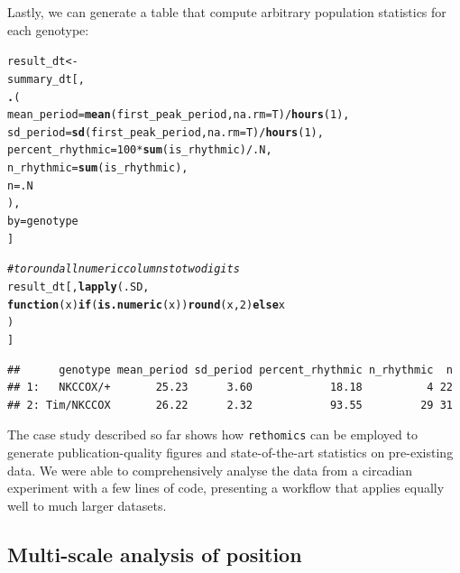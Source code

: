 \documentclass[10pt,letterpaper]{article}\usepackage[]{graphicx}\usepackage[]{color}
\makeatletter
\newcommand{\hlnum}[1]{\textcolor[rgb]{0.686,0.059,0.569}{#1}}%
\newcommand{\hlcom}[1]{\textcolor[rgb]{0.678,0.584,0.686}{\textit{#1}}}%
\newcommand{\hlopt}[1]{\textcolor[rgb]{0,0,0}{#1}}%
\newcommand{\hlstd}[1]{\textcolor[rgb]{0.345,0.345,0.345}{#1}}%
\newcommand{\hlkwa}[1]{\textcolor[rgb]{0.161,0.373,0.58}{\textbf{#1}}}%
\newcommand{\hlkwb}[1]{\textcolor[rgb]{0.69,0.353,0.396}{#1}}%
\newcommand{\hlkwc}[1]{\textcolor[rgb]{0.333,0.667,0.333}{#1}}%
\newcommand{\hlkwd}[1]{\textcolor[rgb]{0.737,0.353,0.396}{\textbf{#1}}}%
\newenvironment{kframe}{%
 \def\at@end@of@kframe{}%
 \ifinner\ifhmode%
  \def\at@end@of@kframe{\end{minipage}}%
  \begin{minipage}{\columnwidth}%
 \fi\fi%
 \def\FrameCommand##1{\hskip\@totalleftmargin \hskip-\fboxsep
 \colorbox{shadecolor}{##1}\hskip-\fboxsep
     \hskip-\linewidth \hskip-\@totalleftmargin \hskip\columnwidth}%
 \MakeFramed {\advance\hsize-\width
   \@totalleftmargin\z@ \linewidth\hsize
   \@setminipage}}%
 {\par\unskip\endMakeFramed%
 \at@end@of@kframe}
\newenvironment{knitrout}{}{} %
\makeatother
\begin{document}
Lastly, we can generate a table that compute arbitrary population statistics for each genotype:
\begin{knitrout}
\color{fgcolor}\begin{kframe}
\begin{alltt}
\hlstd{result_dt} \hlkwb{<-}
  \hlstd{summary_dt[,}
    \hlkwd{.}\hlstd{(}
       \hlkwc{mean_period} \hlstd{=} \hlkwd{mean}\hlstd{(first_peak_period,} \hlkwc{na.rm} \hlstd{= T)} \hlopt{/} \hlkwd{hours}\hlstd{(}\hlnum{1}\hlstd{),}
       \hlkwc{sd_period} \hlstd{=} \hlkwd{sd}\hlstd{(first_peak_period,} \hlkwc{na.rm} \hlstd{= T)} \hlopt{/} \hlkwd{hours}\hlstd{(}\hlnum{1}\hlstd{),}
       \hlkwc{percent_rhythmic} \hlstd{=} \hlnum{100} \hlopt{*} \hlkwd{sum}\hlstd{(is_rhythmic)} \hlopt{/} \hlstd{.N,}
       \hlkwc{n_rhythmic} \hlstd{=} \hlkwd{sum}\hlstd{(is_rhythmic),}
       \hlkwc{n} \hlstd{= .N}
     \hlstd{),}
    \hlkwc{by} \hlstd{= genotype}
  \hlstd{]}

\hlcom{# to round all numeric columns  to two digits}
\hlstd{result_dt[,} \hlkwd{lapply}\hlstd{(.SD,}
                   \hlkwa{function}\hlstd{(}\hlkwc{x}\hlstd{)} \hlkwa{if}\hlstd{(}\hlkwd{is.numeric}\hlstd{(x))} \hlkwd{round}\hlstd{(x,} \hlnum{2}\hlstd{)} \hlkwa{else} \hlstd{x}
                   \hlstd{)}
           \hlstd{]}
\end{alltt}
\begin{verbatim}
##      genotype mean_period sd_period percent_rhythmic n_rhythmic  n
## 1:   NKCCOX/+       25.23      3.60            18.18          4 22
## 2: Tim/NKCCOX       26.22      2.32            93.55         29 31
\end{verbatim}
\end{kframe}
\end{knitrout}



The case study described so far shows how \texttt{rethomics} can be employed to generate publication-quality figures and state-of-the-art statistics on pre-existing data.
We were able to comprehensively analyse the data from a circadian experiment with a few lines of code,
presenting a workflow that applies equally well to much larger datasets.


\subsection*{Multi-scale analysis of position}
\end{document}
